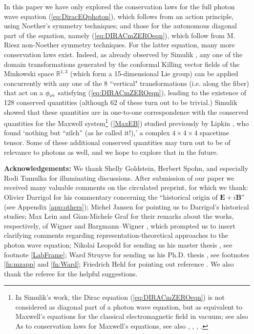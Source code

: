 \documentclass[12pt]{article}
\theoremstyle{definition}
\newcommand{\refeq}[1]{(\ref{#1})}
\numberwithin{equation}{section}
\newcommand{\bB}{\mathbf{B}}
\newcommand{\bE}{\mathbf{E}}
\newcommand{\phiPH}{{\phi_{\mbox{\rm\tiny ph}}}}
\newcommand{\Rset}{{\mathbb R}}
\begin{document}
 In this paper we have only explored the conservation laws for the full photon wave equation \refeq{eq:DiracEQphoton}, which
  follows from an action principle, using Noether's symmetry techniques; and those for the autonomous diagonal part of the 
equation, namely \refeq{eq:DIRACmZEROeqn}, which follow from M. Riesz non-Noether symmetry techniques. 
For the latter equation, many more conservation laws exist.
  Indeed, as already observed by Simulik \cite{Simulik}, any one of the domain transformations generated by the conformal 
Killing vector fields of the Minkowski space $\Rset^{1,3}$ (which form a 15-dimensional Lie group) can be applied concurrently 
with any one of the 8 ``vertical" transformations 
(i.e. along the fiber) that act on a $\phiPH$ satisfying \refeq{eq:DIRACmZEROeqn},
leading to the existence of 128 conserved quantities (although 62 of these turn out to be trivial.)
 Simulik showed that these quantities are in one-to-one correspondence with the conserved quantities for the Maxwell 
system\footnote{In Simulik's work, the 
 Dirac equation \refeq{eq:DIRACmZEROeqn} is not considered as diagonal part of a photon wave equation, but as equivalent to
Maxwell's equations for the classical electromagnetic field in vacuum; see also \cite{Moses1957,Moses1959}
 As to conservation laws for Maxwell's equations, see also \cite{BesselHagen}, \cite{Fushchych}, \cite{AncoPohj}, \cite{AncoThe}.\vspace{-10pt}}
 \refeq{MaxEB} studied previously by Lipkin \cite{Lipkin}, who found `nothing but ``zilch'' (as he called it!),' a complex
$4\times4\times4$ spacetime tensor.
 Some of these additional conserved quantities may turn out to be of relevance to photons as well, and we hope to explore that in the future. 
\bigskip

\noindent
{\bf Acknowledgements:} We thank Shelly Goldstein, Herbert Spohn, and especially Rodi Tumulka for illuminating discussions.  
  After submission of our paper we received many valuable comments on the circulated preprint, for which we thank:
 Olivier Darrigol for his commentary concerning the ``historical origin of $\bE+i\bB$'' (see Appendix \ref{app:others});
 Michel Jansen for pointing us to Darrigol's historical studies; 
 Max Lein and Gian-Michele Graf for their remarks about the works, respectively, of Wigner \cite{Wig1939} and Bargmann--Wigner 
\cite{BarWig1948}, which prompted us to insert clarifying comments regarding representation-theoretical approaches to the photon 
wave equation; Nikolai Leopold for sending us his master thesis \cite{Leopold}, see footnote \ref{LabFrame};
 Ward Struyve for sending us his Ph.D. thesis \cite{StruyvePHD}, see footnotes \ref{fn:mzapp} and \ref{fn:Ward}; 
 Friedrich Hehl for pointing out reference \cite{Cor1953}. 
 We also thank the referee for the helpful suggestions. 
\newpage
\end{document}
